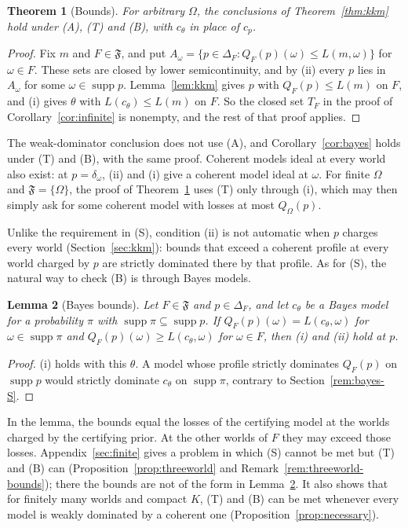 \documentclass[11pt]{article}
\newtheorem{theorem}{Theorem}[section]
\newtheorem{lemma}[theorem]{Lemma}
\theoremstyle{definition}
\theoremstyle{remark}
\newcommand{\F}{\mathfrak F}
\newcommand{\supp}{\operatorname{supp}}
\begin{document}
\begin{theorem}[Bounds]\label{thm:bounds}
For arbitrary $\Omega$, the conclusions of Theorem~\ref{thm:kkm} hold under (A), (T) and (B), with $c_\theta$ in place of $c_p$.
\end{theorem}
\begin{proof}
Fix $m$ and $F\in\F$, and put $A_\omega=\{p\in\Delta_F:Q_F(p)(\omega)\le L(m,\omega)\}$ for $\omega\in F$. These sets are closed by lower semicontinuity, and by (ii) every $p$ lies in $A_\omega$ for some $\omega\in\supp p$. Lemma~\ref{lem:kkm} gives $p$ with $Q_F(p)\le L(m)$ on $F$, and (i) gives $\theta$ with $L(c_\theta)\le L(m)$ on $F$. So the closed set $T_F$ in the proof of Corollary~\ref{cor:infinite} is nonempty, and the rest of that proof applies.
\end{proof}
The weak-dominator conclusion does not use (A), and Corollary~\ref{cor:bayes} holds under (T) and (B), with the same proof. Coherent models ideal at every world also exist: at $p=\delta_\omega$, (ii) and (i) give a coherent model ideal at $\omega$. For finite $\Omega$ and $\F=\{\Omega\}$, the proof of Theorem~\ref{thm:bounds} uses (T) only through (i), which may then simply ask for some coherent model with losses at most $Q_\Omega(p)$.

Unlike the requirement in (S), condition (ii) is not automatic when $p$ charges every world (Section~\ref{sec:kkm}): bounds that exceed a coherent profile at every world charged by $p$ are strictly dominated there by that profile. As for (S), the natural way to check (B) is through Bayes models.

\begin{lemma}[Bayes bounds]\label{lem:bayesbounds}
Let $F\in\F$ and $p\in\Delta_F$, and let $c_\theta$ be a Bayes model for a probability $\pi$ with $\supp\pi\subseteq\supp p$. If $Q_F(p)(\omega)=L(c_\theta,\omega)$ for $\omega\in\supp\pi$ and $Q_F(p)(\omega)\ge L(c_\theta,\omega)$ for $\omega\in F$, then (i) and (ii) hold at $p$.
\end{lemma}
\begin{proof}
(i) holds with this $\theta$. A model whose profile strictly dominates $Q_F(p)$ on $\supp p$ would strictly dominate $c_\theta$ on $\supp\pi$, contrary to Section~\ref{rem:bayes-S}.
\end{proof}
In the lemma, the bounds equal the losses of the certifying model at the worlds charged by the certifying prior. At the other worlds of $F$ they may exceed those losses. Appendix~\ref{sec:finite} gives a problem in which (S) cannot be met but (T) and (B) can (Proposition~\ref{prop:threeworld} and Remark~\ref{rem:threeworld-bounds}); there the bounds are not of the form in Lemma~\ref{lem:bayesbounds}. It also shows that for finitely many worlds and compact $K$, (T) and (B) can be met whenever every model is weakly dominated by a coherent one (Proposition~\ref{prop:necessary}).
\end{document}
